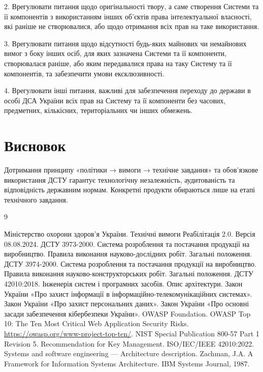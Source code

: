\documentclass{article}
\begin{document}
2. Врегулювати питання щодо оригінальності твору, а саме створення Системи та її компонентів з використанням інших об’єктів права інтелектуальної власності, які раніше не створювалися, або щодо отримання всіх прав на таке використання.

3. Врегулювати питання щодо відсутності будь-яких майнових чи немайнових вимог з боку інших осіб, для яких зазначена Системи та її компоненти, створювалася раніше, або яким передавалися права на таку Систему та її компонентів, та забезпечити умови ексклюзивності.

4. Врегулювати інші питання, важливі для забезпечення переходу до держави в особі ДСА України всіх прав на Систему та її компоненти  без часових, предметних, кількісних, територіальних чи інших обмежень.

\newpage
\section*{Висновок}

Дотримання принципу «політики → вимоги → технічне завдання» та обов’язкове використання ДСТУ гарантує технологічну незалежність, аудитованість та відповідність державним нормам. Конкретні продукти обираються лише на етапі технічного завдання.

\begin{thebibliography}{9}

 Міністерство охорони здоров’я України. \newblock Технічні вимоги Реабілітація 2.0. \newblock Версія 08.08.2024.
 ДСТУ 3973-2000. \newblock Система розроблення та постачання продукції на виробництво. Правила виконання науково-дослідних робіт. Загальні положення.
 ДСТУ 3974-2000. \newblock Система розроблення та постачання продукції на виробництво. Правила виконання науково-конструкторських робіт. Загальні положення.
 ДСТУ 42010:2018. \newblock Інженерія систем і програмних засобів. Опис архітектури.
 Закон України «Про захист інформації в інформаційно-телекомунікаційних системах».
 Закон України «Про захист персональних даних».
 Закон України «Про основні засади забезпечення кібербезпеки України».
 OWASP Foundation. \newblock OWASP Top 10: The Ten Most Critical Web Application Security Risks. \newblock \url{https://owasp.org/www-project-top-ten/}.
 NIST Special Publication 800-57 Part 1 Revision 5. \newblock Recommendation for Key Management.
 ISO/IEC/IEEE 42010:2022. \newblock Systems and software engineering — Architecture description.
 Zachman, J.A. \newblock A Framework for Information Systems Architecture. \newblock IBM Systems Journal, 1987.

\end{thebibliography}
\end{document}

